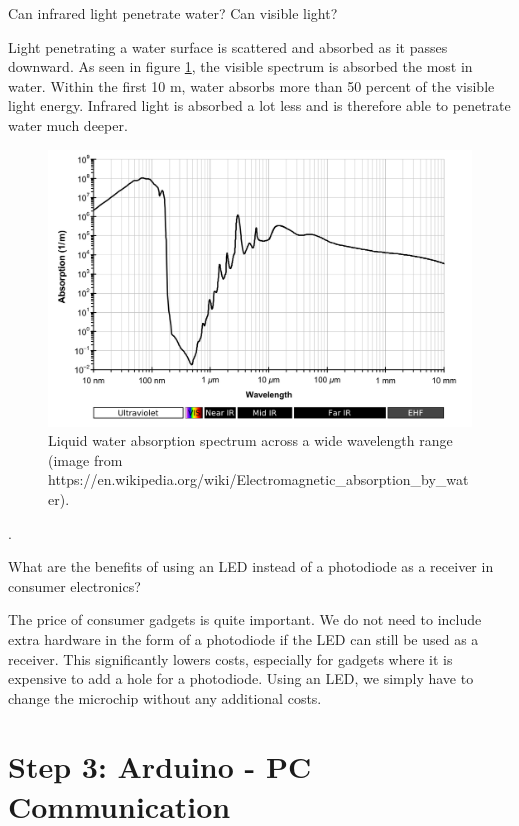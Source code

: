 \documentclass[
	12pt, %
]{fphw}
\begin{document}
\begin{problem}
	Can infrared light penetrate water? Can visible light?
\end{problem}
Light penetrating a water surface is scattered and absorbed as it passes downward. As seen in figure \ref{fig:water_absorption}, the visible spectrum is absorbed the most in water. Within the first 10 m, water absorbs more than 50 percent of the visible light energy. Infrared light is absorbed a lot less and is therefore able to penetrate water much deeper.

\begin{figure}[!htbp] 
	\centering
	\includegraphics[width=0.75\columnwidth]{figures/water_absorption.png}
	\caption{Liquid water absorption spectrum across a wide wavelength range (image from https://en.wikipedia.org/wiki/Electromagnetic\_absorption\_by\_water).}
	\label{fig:water_absorption}
\end{figure}
\FloatBarrier. 

\begin{problem}
	What are the benefits of using an LED instead of a photodiode as a receiver in consumer electronics?
\end{problem}
The price of consumer gadgets is quite important. We do not need to include extra hardware in the form of a photodiode if the LED can still be used as a receiver. This significantly lowers costs, especially for gadgets where it is expensive to add a hole for a photodiode. Using an LED, we simply have to change the microchip without any additional costs.


\section*{Step 3: Arduino - PC Communication}
\end{document}
